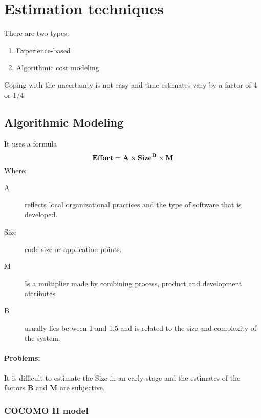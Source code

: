 \documentclass[a4paper,11pt,twocolumn]{report}
\begin{document}
    \section{Estimation techniques}
    There are two types:
    \begin{enumerate}
        \item Experience-based
        \item Algorithmic cost modeling
    \end{enumerate}
    Coping with the uncertainty is not easy and time estimates vary by a factor
    of 4 or 1/4 
    \subsection{Algorithmic Modeling}
    It uses a formula
    \[\mbox{\textbf{Effort}} = \textbf{A}\times
        \mbox{\textbf{Size}}^\textbf{B}\times \textbf{M}\]
    Where:
    \begin{description}
        \item[A] reflects local organizational practices and the type of
            software that is developed.
        \item[Size] code size or application points.
        \item[M] Is a multiplier made by combining process, product and
            development attributes
        \item[B]usually lies between 1 and 1.5 and is related to the size and
            complexity of the system.
    \end{description}
    \paragraph{Problems:}
    It is difficult to estimate the Size in an early stage and the estimates of
    the factors \textbf{B} and \textbf{M} are subjective.
    \subsubsection{COCOMO II model}
\end{document}
